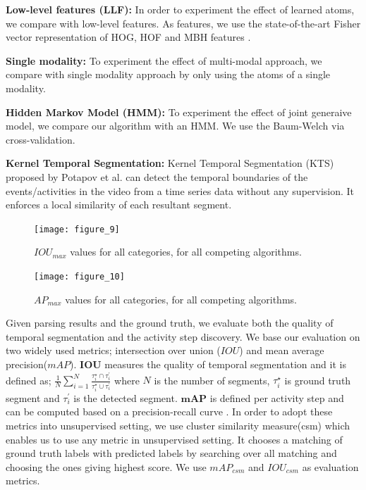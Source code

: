 \noindent\textbf{Low-level features (LLF):}
In order to experiment the effect of learned atoms, we compare with low-level features. As features, we use the state-of-the-art Fisher vector representation of HOG, HOF and MBH features \cite{THUMOS14}.

\noindent\textbf{Single modality:}
To experiment the effect of multi-modal approach, we compare with single modality approach by only using the atoms of a single modality.

\noindent\textbf{Hidden Markov Model (HMM):}
To experiment the effect of joint generaive model, we compare our algorithm with an HMM. We use the Baum-Welch \cite{rabiner} via cross-validation.


\noindent\textbf{Kernel Temporal Segmentation\cite{potapov2014category}:}
Kernel Temporal Segmentation (KTS) proposed by Potapov et al.\cite{potapov2014category} can detect the temporal boundaries of the events/activities in the video from a time series data without any supervision. It enforces a local similarity of each resultant segment.

\begin{figure}[t]
  \texttt{[image: figure\_9]}
  \vspace{-9mm}
  \caption{$IOU_{max}$ values for all categories, for all competing algorithms.}
  \label{mIOU}
\texttt{[image: figure\_10]}
\vspace{-9mm}
\caption{$AP_{max}$ values for all categories, for all competing algorithms.}
\vspace{-3mm}
\label{mmAP}
\end{figure}

Given parsing results and the ground truth, we evaluate both the quality of temporal segmentation and the activity step discovery. We base our evaluation on two widely used metrics; intersection over union ($IOU$) and mean average precision($mAP$). $\mathbf{IOU}$ measures the quality of temporal segmentation and it is defined as; $\frac{1}{N}\sum_{i=1}^N \frac{\tau^\star_i \cap \tau^\prime_{i}}{\tau^\star_i \cup \tau^\prime_{i}}$ where $N$ is the number of segments, $\tau^\star_i$ is ground truth  segment and $\tau^\prime_{i}$ is the detected segment. $\mathbf{mAP}$ is defined per activity step and can be computed based on a precision-recall curve \cite{THUMOS14}. In order to adopt these metrics into unsupervised setting, we use cluster similarity measure(csm)\cite{liao05} which enables us to use any metric in unsupervised setting. It chooses a matching of ground truth labels with predicted labels by searching over all matching and choosing the ones giving highest score. We use $mAP_{csm}$ and $IOU_{csm}$ as evaluation metrics.

